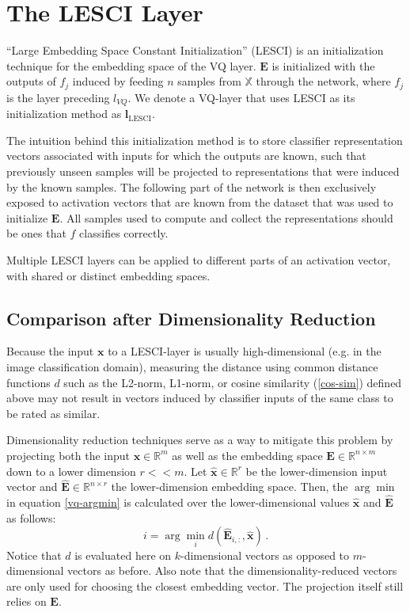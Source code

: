 \documentclass{article}
\begin{document}
\section{The LESCI Layer}

\enquote{Large Embedding Space Constant Initialization} (LESCI) is an initialization technique for the embedding space of the VQ layer. $\bm{E}$ is initialized with the outputs of $f_j$ induced by feeding $n$ samples from $\mathbb{X}$ through the network, where $f_j$ is the layer preceding $l_{VQ}$. We denote a VQ-layer that uses LESCI as its initialization method as $\bm{l}_\text{LESCI}$.

The intuition behind this initialization method is to store classifier representation vectors associated with inputs for which the outputs are known, such that previously unseen samples will be projected to representations that were induced by the known samples. The following part of the network is then exclusively exposed to activation vectors that are known from the dataset that was used to initialize $\bm{E}$. All samples used to compute and collect the representations should be ones that $f$ classifies correctly.

Multiple LESCI layers can be applied to different parts of an activation vector, with shared or distinct embedding spaces.

\subsection{Comparison after Dimensionality Reduction}
Because the input $\bm{x}$ to a LESCI-layer is usually high-dimensional (e.g. in the image classification domain), measuring the distance using common distance functions $d$ such as the L2-norm, L1-norm, or cosine similarity (\ref{cos-sim}) defined above may not result in vectors induced by classifier inputs of the same class to be rated as similar. 

Dimensionality reduction techniques serve as a way to mitigate this problem by projecting both the input $\bm{x} \in \mathbb{R}^m$ as well as the embedding space $\bm{E} \in \mathbb{R}^{n \times m}$ down to a lower dimension $r << m$. Let $\bm{\hat{x}} \in \mathbb{R}^r$ be the lower-dimension input vector and $\bm{\hat{E}} \in \mathbb{R}^{n \times r}$ the lower-dimension embedding space. Then, the $\arg\min$ in equation \ref{vq-argmin} is calculated over the lower-dimensional values $\bm{\hat{x}}$ and $\bm{\hat{E}}$ as follows:
\begin{equation}
    i=\arg\min_i d\left(\bm{\hat{E}}_{i,:},\bm{\hat{x}}\right)\,.
\end{equation}
Notice that $d$ is evaluated here on $k$-dimensional vectors as opposed to $m$-dimensional vectors as before.
Also note that the dimensionality-reduced vectors are only used for choosing the closest embedding vector. The projection itself still relies on $\bm{E}$.
\end{document}
